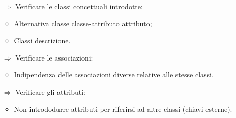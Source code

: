 \begin{itemize}
    \item [$\Rightarrow$] Verificare le classi concettuali introdotte:
    \begin{itemize}
        \item Alternativa classe classe-attributo attributo;
        \item Classi descrizione.
    \end{itemize}
    \item [$\Rightarrow$] Verificare le associazioni:
    \begin{itemize}
        \item Indipendenza delle associazioni diverse relative alle stesse classi.
    \end{itemize}
    \item [$\Rightarrow$] Verificare gli attributi:
    \begin{itemize}
        \item Non intrododurre attributi per riferirsi ad altre classi (chiavi esterne).
    \end{itemize}
\end{itemize}


